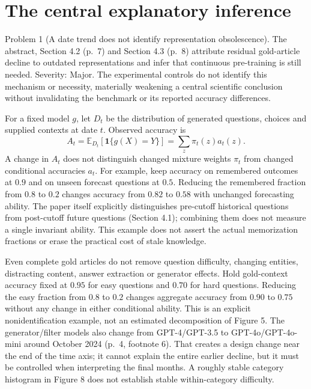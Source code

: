\documentclass[10pt]{article}
\begin{document}
\section*{The central explanatory inference}
Problem 1 (A date trend does not identify representation obsolescence).  The abstract, Section 4.2 (p. 7) and Section 4.3 (p. 8) attribute residual gold-article decline to outdated representations and infer that continuous pre-training is still needed. Severity: Major. The experimental controls do not identify this mechanism or necessity, materially weakening a central scientific conclusion without invalidating the benchmark or its reported accuracy differences.\par
For a fixed model \(g\), let \(D_t\) be the distribution of generated questions, choices and supplied contexts at date \(t\). Observed accuracy is \[A_t=\mathbb{E}_{D_t}[\mathbf1\{g(X)=Y\}]
     =\sum_z\pi_t(z)a_t(z).\] A change in \(A_t\) does not distinguish changed mixture weights \(\pi_t\) from changed conditional accuracies \(a_t\). For example, keep accuracy on remembered outcomes at \(0.9\) and on unseen forecast questions at \(0.5\). Reducing the remembered fraction from \(0.8\) to \(0.2\) changes accuracy from \(0.82\) to \(0.58\) with unchanged forecasting ability. The paper itself explicitly distinguishes pre-cutoff historical questions from post-cutoff future questions (Section 4.1); combining them does not measure a single invariant ability. This example does not assert the actual memorization fractions or erase the practical cost of stale knowledge.\par
Even complete gold articles do not remove question difficulty, changing entities, distracting content, answer extraction or generator effects. Hold gold-context accuracy fixed at \(0.95\) for easy questions and \(0.70\) for hard questions. Reducing the easy fraction from \(0.8\) to \(0.2\) changes aggregate accuracy from \(0.90\) to \(0.75\) without any change in either conditional ability. This is an explicit nonidentification example, not an estimated decomposition of Figure 5. The generator/filter models also change from GPT-4/GPT-3.5 to GPT-4o/GPT-4o-mini around October 2024 (p. 4, footnote 6). That creates a design change near the end of the time axis; it cannot explain the entire earlier decline, but it must be controlled when interpreting the final months. A roughly stable category histogram in Figure 8 does not establish stable within-category difficulty.\par
\end{document}
